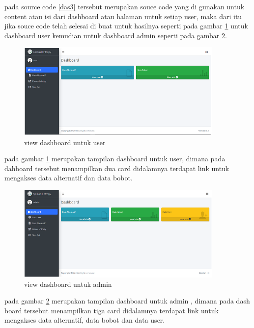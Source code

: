 
pada source code \ref{das3} tersebut merupakan souce code yang di gunakan untuk content atau isi dari dashboard atau halaman untuk setiap user, maka dari itu jika souce code telah selesai di buat untuk hasilnya seperti pada gambar \ref{ve5} untuk dashboard user kemudian untuk dashboard admin seperti pada gambar \ref{ve6}.

\begin{figure}[!htbp]
	\centerline{\includegraphics[width=0.90\textwidth]{figures/view/5.png}}
	\caption{view dashboard untuk user}
	\label{ve5}
\end{figure}

pada gambar \ref{ve5} merupakan tampilan dashboard untuk user, dimana pada dahboard tersebut menampilkan dua card didalamnya terdapat link untuk mengakses data alternatif dan data bobot.


\begin{figure}[!htbp]
	\centerline{\includegraphics[width=0.90\textwidth]{figures/view/6.png}}
	\caption{view dashboard untuk admin}
	\label{ve6}
\end{figure}

pada gambar \ref{ve6} merupakan tampilan dashboard untuk admin , dimana pada dash board tersebut menampilkan tiga card didalamnya terdapat link untuk mengakses data alternatif, data bobot dan data user.
\pagebreak

